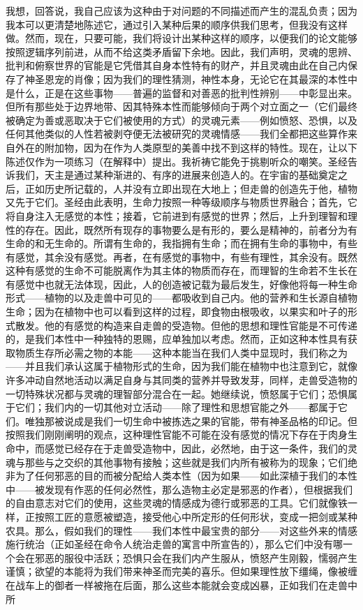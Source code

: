 我想，回答说，我自己应该为这种由于对问题的不同描述而产生的混乱负责；因为我本可以更清楚地陈述它，通过引入某种后果的顺序供我们思考，但我没有这样做。然而，现在，只要可能，我们将设计出某种这样的顺序，以便我们的论文能够按照逻辑序列前进，从而不给这类矛盾留下余地。因此，我们声明，灵魂的思辨、批判和俯察世界的官能是它凭借其自身本性特有的财产，并且灵魂由此在自己内保存了神圣恩宠的肖像；因为我们的理性猜测，神性本身，无论它在其最深的本性中是什么，正是在这些事物——普遍的监督和对善恶的批判性辨别——中彰显出来。但所有那些处于边界地带、因其特殊本性而能够倾向于两个对立面之一（它们最终被确定为善或恶取决于它们被使用的方式）的灵魂元素——例如愤怒、恐惧，以及任何其他类似的人性若被剥夺便无法被研究的灵魂情感——我们全都把这些算作来自外在的附加物，因为在作为人类原型的美善中找不到这样的特性。现在，让以下陈述仅作为一项练习（在解释中）提出。我祈祷它能免于挑剔听众的嘲笑。圣经告诉我们，天主是通过某种渐进的、有序的进展来创造人的。在宇宙的基础奠定之后，正如历史所记载的，人并没有立即出现在大地上；但走兽的创造先于他，植物又先于它们。圣经由此表明，生命力按照一种等级顺序与物质世界融合；首先，它将自身注入无感觉的本性；接着，它前进到有感觉的世界；然后，上升到理智和理性的存在。因此，既然所有现存的事物要么是有形的，要么是精神的，前者分为有生命的和无生命的。所谓有生命的，我指拥有生命；而在拥有生命的事物中，有些有感觉，其余没有感觉。再者，在有感觉的事物中，有些有理性，其余没有。既然这种有感觉的生命不可能脱离作为其主体的物质而存在，而理智的生命若不生长在有感觉中也就无法体现，因此，人的创造被记载为最后发生，好像他将每一种生命形式——植物的以及走兽中可见的——都吸收到自己内。他的营养和生长源自植物生命；因为在植物中也可以看到这样的过程，即食物由根吸收，以果实和叶子的形式散发。他的有感觉的构造来自走兽的受造物。但他的思想和理性官能是不可传递的，是我们本性中一种独特的恩赐，应单独加以考虑。然而，正如这种本性具有获取物质生存所必需之物的本能——这种本能当在我们人类中显现时，我们称之为——并且我们承认这属于植物形式的生命，因为我们能在植物中也注意到它，就像许多冲动自然地活动以满足自身与其同类的营养并导致发芽，同样，走兽受造物的一切特殊状况都与灵魂的理智部分混合在一起。她继续说，愤怒属于它们；恐惧属于它们；我们内的一切其他对立活动——除了理性和思想官能之外——都属于它们。唯独那被说成是我们一切生命中被拣选之果的官能，带有神圣品格的印记。但按照我们刚刚阐明的观点，这种理性官能不可能在没有感觉的情况下存在于肉身生命中，而感觉已经存在于走兽受造物中，因此，必然地，由于这一条件，我们的灵魂与那些与之交织的其他事物有接触；这些就是我们内所有被称为的现象；它们绝非为了任何邪恶的目的而被分配给人类本性（因为如果——如此深植于我们的本性中——被发现有作恶的任何必然性，那么造物主必定是邪恶的作者），但根据我们的自由意志对它们的使用，这些灵魂的情感成为德行或邪恶的工具。它们就像铁一样，正按照工匠的意愿被塑造，接受他心中所定形的任何形状，变成一把剑或某种农具。那么，假如我们的理性——我们本性中最宝贵的部分——对这些外来的情感施行统治（正如圣经在命令人统治走兽的寓言中所宣告的），那么它们中没有哪一个会在邪恶的服役中活跃；恐惧只会在我们内产生服从，愤怒产生刚毅，懦弱产生谨慎；欲望的本能将为我们带来神圣而完美的喜乐。但如果理性放下缰绳，像被缠在战车上的御者一样被拖在后面，那么这些本能就会变成凶暴，正如我们在走兽中所